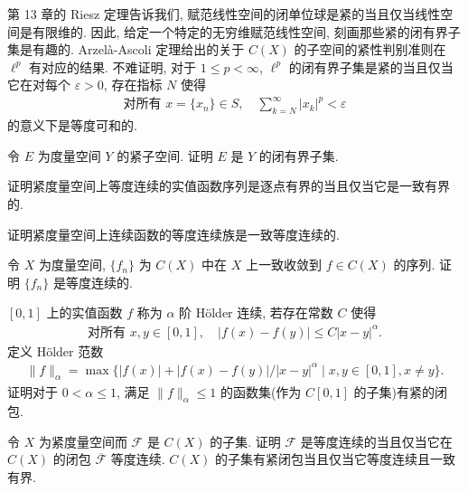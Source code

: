 \documentclass[../../main.tex]{subfiles}
\begin{document}
\begin{remark}\label{remark:ch10-lp紧}
第 13 章的 Riesz 定理告诉我们, 赋范线性空间的闭单位球是紧的当且仅当线性空间是有限维的. 因此, 给定一个特定的无穷维赋范线性空间, 刻画那些紧的闭有界子集是有趣的. Arzel\`a-Ascoli 定理给出的关于 $C(X)$ 的子空间的紧性判别准则在 $\ell^{p}$ 有对应的结果. 不难证明, 对于 $1\leqslant p<\infty$, $\ell^{p}$ 的闭有界子集是紧的当且仅当它在对每个 $\varepsilon>0$, 存在指标 $N$ 使得
\begin{align*}
\text{对所有 }x=\{x_{n}\}\in S,\quad\sum_{k=N}^{\infty}|x_{k}|^{p}<\varepsilon
\end{align*}
的意义下是等度可和的.
\end{remark}

\begin{exercise}\label{exercise:ch10-01}
令 $E$ 为度量空间 $Y$ 的紧子空间. 证明 $E$ 是 $Y$ 的闭有界子集.
\end{exercise}

\begin{exercise}\label{exercise:ch10-02}
证明紧度量空间上等度连续的实值函数序列是逐点有界的当且仅当它是一致有界的.
\end{exercise}

\begin{exercise}\label{exercise:ch10-03}
证明紧度量空间上连续函数的等度连续族是一致等度连续的.
\end{exercise}

\begin{exercise}\label{exercise:ch10-04}
令 $X$ 为度量空间, $\{f_{n}\}$ 为 $C(X)$ 中在 $X$ 上一致收敛到 $f\in C(X)$ 的序列. 证明 $\{f_{n}\}$ 是等度连续的.
\end{exercise}

\begin{exercise}\label{exercise:ch10-05}
$[0,1]$ 上的实值函数 $f$ 称为 $\alpha$ 阶 H\"older 连续, 若存在常数 $C$ 使得
\begin{align*}
\text{对所有 }x,y\in[0,1],\quad|f(x)-f(y)|\leqslant C|x-y|^{\alpha}.
\end{align*}
定义 H\"older 范数
\begin{align*}
\|f\|_{\alpha}=\max\{|f(x)|+|f(x)-f(y)|/|x-y|^{\alpha}\mid x,y\in[0,1],x\neq y\}.
\end{align*}
证明对于 $0<\alpha\leqslant 1$, 满足 $\|f\|_{\alpha}\leqslant 1$ 的函数集(作为 $C[0,1]$ 的子集)有紧的闭包.
\end{exercise}

\begin{exercise}\label{exercise:ch10-06}
令 $X$ 为紧度量空间而 $\mathcal{F}$ 是 $C(X)$ 的子集. 证明 $\mathcal{F}$ 是等度连续的当且仅当它在 $C(X)$ 的闭包 $\overline{\mathcal{F}}$ 等度连续. $C(X)$ 的子集有紧闭包当且仅当它等度连续且一致有界.
\end{exercise}
\end{document}
